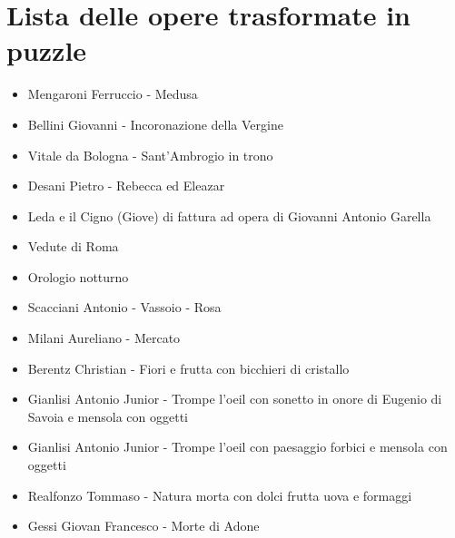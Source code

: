 \documentclass[hidelinks,12pt,a4paper]{article}
\begin{document}
	\section{Lista delle opere trasformate in puzzle}
	\begin{itemize}
		\item Mengaroni Ferruccio - Medusa
		\item Bellini Giovanni - Incoronazione della Vergine
		\item Vitale da Bologna - Sant'Ambrogio in trono
		\item Desani Pietro - Rebecca ed Eleazar
		\item Leda e il Cigno (Giove) di fattura ad opera di Giovanni Antonio Garella
		\item Vedute di Roma
		\item Orologio notturno
		\item Scacciani Antonio - Vassoio - Rosa
		\item Milani Aureliano - Mercato
		\item Berentz Christian - Fiori e frutta con bicchieri di cristallo
		\item Gianlisi Antonio Junior - Trompe l'oeil con sonetto in onore di Eugenio di Savoia e mensola con oggetti
		\item Gianlisi Antonio Junior - Trompe l'oeil con paesaggio forbici e mensola con oggetti
		\item Realfonzo Tommaso - Natura morta con dolci frutta uova e formaggi
		\item Gessi Giovan Francesco - Morte di Adone
	\end{itemize}
\end{document}
